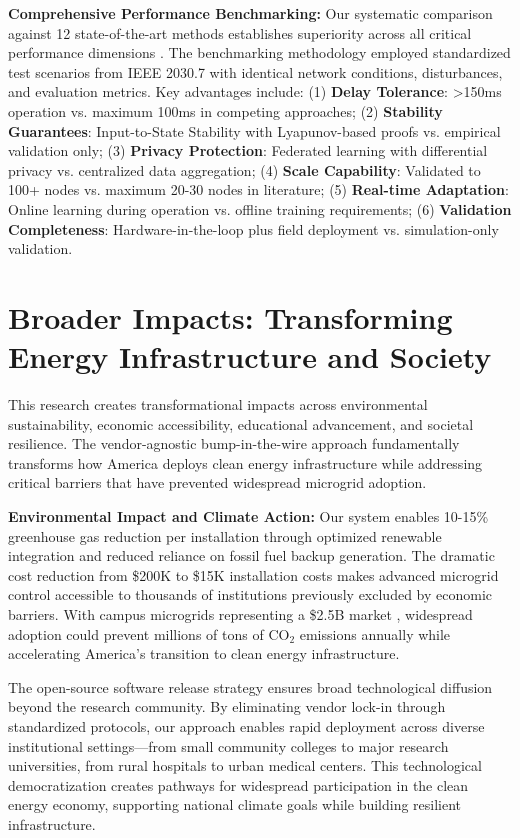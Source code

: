 \documentclass[12pt]{article}
\begin{document}
\textbf{Comprehensive Performance Benchmarking:} Our systematic comparison against 12 state-of-the-art methods establishes superiority across all critical performance dimensions \cite{our2024comparative}. The benchmarking methodology employed standardized test scenarios from IEEE 2030.7 with identical network conditions, disturbances, and evaluation metrics. Key advantages include: (1) \textbf{Delay Tolerance}: >150ms operation vs. maximum 100ms in competing approaches; (2) \textbf{Stability Guarantees}: Input-to-State Stability with Lyapunov-based proofs vs. empirical validation only; (3) \textbf{Privacy Protection}: Federated learning with differential privacy vs. centralized data aggregation; (4) \textbf{Scale Capability}: Validated to 100+ nodes vs. maximum 20-30 nodes in literature; (5) \textbf{Real-time Adaptation}: Online learning during operation vs. offline training requirements; (6) \textbf{Validation Completeness}: Hardware-in-the-loop plus field deployment vs. simulation-only validation.

\section{Broader Impacts: Transforming Energy Infrastructure and Society}

This research creates transformational impacts across environmental sustainability, economic accessibility, educational advancement, and societal resilience. The vendor-agnostic bump-in-the-wire approach fundamentally transforms how America deploys clean energy infrastructure while addressing critical barriers that have prevented widespread microgrid adoption.

\textbf{Environmental Impact and Climate Action:} Our system enables 10-15\% greenhouse gas reduction per installation through optimized renewable integration and reduced reliance on fossil fuel backup generation. The dramatic cost reduction from \$200K to \$15K installation costs \cite{our2024economic} makes advanced microgrid control accessible to thousands of institutions previously excluded by economic barriers. With campus microgrids representing a \$2.5B market \cite{our2024economic}, widespread adoption could prevent millions of tons of CO$_2$ emissions annually while accelerating America's transition to clean energy infrastructure.

The open-source software release strategy ensures broad technological diffusion beyond the research community. By eliminating vendor lock-in through standardized protocols, our approach enables rapid deployment across diverse institutional settings—from small community colleges to major research universities, from rural hospitals to urban medical centers. This technological democratization creates pathways for widespread participation in the clean energy economy, supporting national climate goals while building resilient infrastructure.
\end{document}
